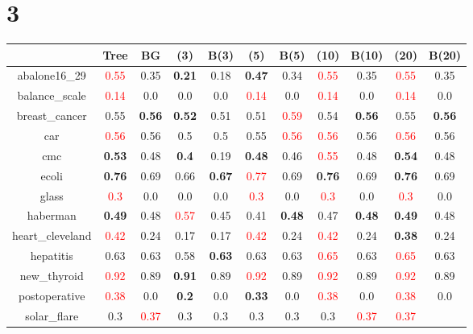 \documentclass{article}%
\begin{document}
\section*{3}%
\begin{tabular}{c|cccccccccc}%
\hline%
&Tree&BG&(3)&B(3)&(5)&B(5)&(10)&B(10)&(20)&B(20)\\%
\hline%
abalone16\_29&\textcolor{red}{ 
0.55
}&0.35&\textbf{0.21}&0.18&\textbf{0.47}&0.34&\textcolor{red}{ 
0.55
}&0.35&\textcolor{red}{ 
0.55
}&0.35\\%
\hline%
balance\_scale&\textcolor{red}{ 
0.14
}&0.0&0.0&0.0&\textcolor{red}{ 
0.14
}&0.0&\textcolor{red}{ 
0.14
}&0.0&\textcolor{red}{ 
0.14
}&0.0\\%
\hline%
breast\_cancer&0.55&\textbf{0.56}&\textbf{0.52}&0.51&0.51&\textcolor{red}{ 
0.59
}&0.54&\textbf{0.56}&0.55&\textbf{0.56}\\%
\hline%
car&\textcolor{red}{ 
0.56
}&0.56&0.5&0.5&0.55&\textcolor{red}{ 
0.56
}&\textcolor{red}{ 
0.56
}&0.56&\textcolor{red}{ 
0.56
}&0.56\\%
\hline%
cmc&\textbf{0.53}&0.48&\textbf{0.4}&0.19&\textbf{0.48}&0.46&\textcolor{red}{ 
0.55
}&0.48&\textbf{0.54}&0.48\\%
\hline%
ecoli&\textbf{0.76}&0.69&0.66&\textbf{0.67}&\textcolor{red}{ 
0.77
}&0.69&\textbf{0.76}&0.69&\textbf{0.76}&0.69\\%
\hline%
glass&\textcolor{red}{ 
0.3
}&0.0&0.0&0.0&\textcolor{red}{ 
0.3
}&0.0&\textcolor{red}{ 
0.3
}&0.0&\textcolor{red}{ 
0.3
}&0.0\\%
\hline%
haberman&\textbf{0.49}&0.48&\textcolor{red}{ 
0.57
}&0.45&0.41&\textbf{0.48}&0.47&\textbf{0.48}&\textbf{0.49}&0.48\\%
\hline%
heart\_cleveland&\textcolor{red}{ 
0.42
}&0.24&0.17&0.17&\textcolor{red}{ 
0.42
}&0.24&\textcolor{red}{ 
0.42
}&0.24&\textbf{0.38}&0.24\\%
\hline%
hepatitis&0.63&0.63&0.58&\textbf{0.63}&0.63&0.63&\textcolor{red}{ 
0.65
}&0.63&\textcolor{red}{ 
0.65
}&0.63\\%
\hline%
new\_thyroid&\textcolor{red}{ 
0.92
}&0.89&\textbf{0.91}&0.89&\textcolor{red}{ 
0.92
}&0.89&\textcolor{red}{ 
0.92
}&0.89&\textcolor{red}{ 
0.92
}&0.89\\%
\hline%
postoperative&\textcolor{red}{ 
0.38
}&0.0&\textbf{0.2}&0.0&\textbf{0.33}&0.0&\textcolor{red}{ 
0.38
}&0.0&\textcolor{red}{ 
0.38
}&0.0\\%
\hline%
solar\_flare&0.3&\textcolor{red}{ 
0.37
}&0.3&0.3&0.3&0.3&0.3&\textcolor{red}{ 
0.37
}&\textcolor{red}{ 
0.37
}
\end{tabular}
\end{document}
